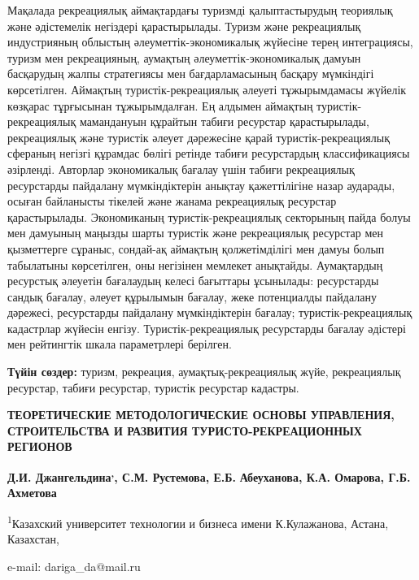 Мақалада рекреациялық аймақтардағы туризмді қалыптастырудың теориялық
және әдістемелік негіздері қарастырылады. Туризм және рекреациялық
индустрияның облыстың әлеуметтік-экономикалық жүйесіне терең
интеграциясы, туризм мен рекреацияның, аумақтың әлеуметтік-экономикалық
дамуын басқарудың жалпы стратегиясы мен бағдарламасының басқару
мүмкіндігі көрсетілген. Аймақтың туристік-рекреациялық әлеуеті
тұжырымдамасы жүйелік көзқарас тұрғысынан тұжырымдалған. Ең алдымен
аймақтың туристік-рекреациялық мамандануын құрайтын табиғи ресурстар
қарастырылады, рекреациялық және туристік әлеует дәрежесіне қарай
туристік-рекреациялық сфераның негізгі құрамдас бөлігі ретінде табиғи
ресурстардың классификациясы әзірленді. Авторлар экономикалық бағалау
үшін табиғи рекреациялық ресурстарды пайдалану мүмкіндіктерін анықтау
қажеттілігіне назар аударады, осыған байланысты тікелей және жанама
рекреациялық ресурстар қарастырылады. Экономиканың туристік-рекреациялық
секторының пайда болуы мен дамуының маңызды шарты туристік және
рекреациялық ресурстар мен қызметтерге сұраныс, сондай-ақ аймақтың
қолжетімділігі мен дамуы болып табылатыны көрсетілген, оны негізінен
мемлекет анықтайды. Аумақтардың ресурстық әлеуетін бағалаудың келесі
бағыттары ұсынылады: ресурстарды сандық бағалау, әлеует құрылымын
бағалау, жеке потенциалды пайдалану дәрежесі, ресурстарды пайдалану
мүмкіндіктерін бағалау; туристік-рекреациялық кадастрлар жүйесін енгізу.
Туристік-рекреациялық ресурстарды бағалау әдістері мен рейтингтік шкала
параметрлері берілген.

{\bfseries Түйін сөздер:} туризм, рекреация, аумақтық-рекреациялық жүйе,
рекреациялық ресурстар, табиғи ресурстар, туристік ресурстар кадастры.

{\bfseries ТЕОРЕТИЧЕСКИЕ МЕТОДОЛОГИЧЕСКИЕ ОСНОВЫ УПРАВЛЕНИЯ, СТРОИТЕЛЬСТВА
И РАЗВИТИЯ ТУРИСТО-РЕКРЕАЦИОННЫХ РЕГИОНОВ}

{\bfseries Д.И. Джангельдина\textsuperscript{,}, С.М. Рустемова, Е.Б.}
{\bfseries Абеуханова, К.А. Омарова, Г.Б. Ахметова}

\textsuperscript{1}Казахский университет технологии и бизнеса имени
К.Кулажанова, Астана, Казахстан,

e-mail: dariga\_da@mail.ru

